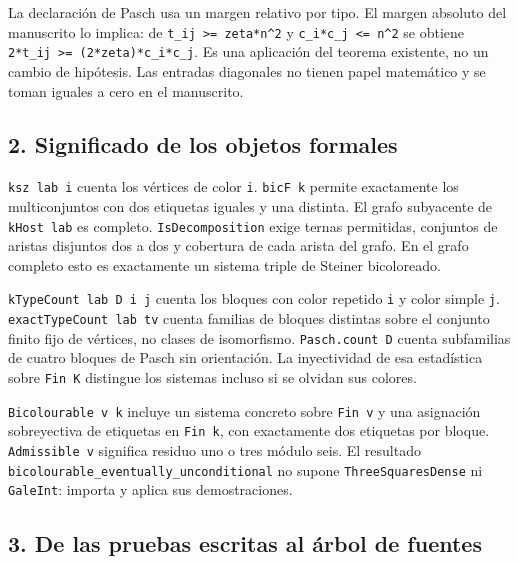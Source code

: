 \documentclass[spanish,11pt,a4paper]{article}
\begin{document}
La declaración de Pasch usa un margen relativo por tipo. El margen absoluto del manuscrito lo implica: de \texttt{t\_ij\ \textgreater{}=\ zeta*n\^{}2} y \texttt{c\_i*c\_j\ \textless{}=\ n\^{}2} se obtiene \texttt{2*t\_ij\ \textgreater{}=\ (2*zeta)*c\_i*c\_j}. Es una aplicación del teorema existente, no un cambio de hipótesis. Las entradas diagonales no tienen papel matemático y se toman iguales a cero en el manuscrito.

\subsection{2. Significado de los objetos formales}\label{significado-de-los-objetos-formales}

\texttt{ksz\ lab\ i} cuenta los vértices de color \texttt{i}. \texttt{bic\allowbreak{}F\ k} permite exactamente los multiconjuntos con dos etiquetas iguales y una distinta. El grafo subyacente de \texttt{k\allowbreak{}Host\ lab} es completo. \texttt{Is\allowbreak{}Decomposition} exige ternas permitidas, conjuntos de aristas disjuntos dos a dos y cobertura de cada arista del grafo. En el grafo completo esto es exactamente un sistema triple de Steiner bicoloreado.

\texttt{k\allowbreak{}Type\allowbreak{}Count\ lab\ D\ i\ j} cuenta los bloques con color repetido \texttt{i} y color simple \texttt{j}. \texttt{exact\allowbreak{}Type\allowbreak{}Count\ lab\ tv} cuenta familias de bloques distintas sobre el conjunto finito fijo de vértices, no clases de isomorfismo. \texttt{Pasch.\allowbreak{}count\ D} cuenta subfamilias de cuatro bloques de Pasch sin orientación. La inyectividad de esa estadística sobre \texttt{Fin\ K} distingue los sistemas incluso si se olvidan sus colores.

\texttt{Bicolourable\ v\ k} incluye un sistema concreto sobre \texttt{Fin\ v} y una asignación sobreyectiva de etiquetas en \texttt{Fin\ k}, con exactamente dos etiquetas por bloque. \texttt{Admissible\ v} significa residuo uno o tres módulo seis. El resultado \texttt{bicolourable\_\allowbreak{}eventually\_\allowbreak{}unconditional} no supone \texttt{Three\allowbreak{}Squares\allowbreak{}Dense} ni \texttt{Gale\allowbreak{}Int}: importa y aplica sus demostraciones.

\subsection{3. De las pruebas escritas al árbol de fuentes}\label{de-las-pruebas-escritas-al-uxe1rbol-de-fuentes}
\end{document}
